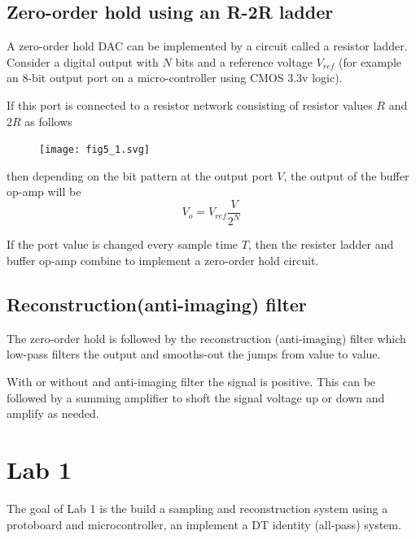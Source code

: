 \documentclass{article}
\begin{document}
\subsection{Zero-order hold using an R-2R ladder}

A zero-order hold DAC can be implemented by a circuit called a resistor ladder. Consider a digital output with $N$ bits and a reference voltage $V_{ref}$ (for example an 8-bit output port on a micro-controller using CMOS 3.3v logic).

If this port is connected to a resistor network consisting of resistor values $R$ and $2R$ as follows

\begin{figure}
  \centering
  \texttt{[image: fig5\_1.svg]}
\end{figure}

then depending on the bit pattern at the output port $V$, the output of the buffer op-amp will be
\[
V_o = V_{ref}\frac{V}{2^N}
\]

If the port value is changed every sample time $T$, then the resister ladder and buffer op-amp combine to implement a zero-order hold circuit.

\subsection{Reconstruction(anti-imaging) filter}

The zero-order hold is followed by the reconstruction (anti-imaging) filter which low-pass filters the output and smooths-out the jumps from value to value.

With or without and anti-imaging filter the signal is positive. This can be followed by a summing amplifier to shoft the signal voltage up or down and amplify as needed.

\section{Lab 1}

The goal of Lab 1 is the build a sampling and reconstruction system using a protoboard and microcontroller, an implement a DT identity (all-pass) system.
\end{document}
